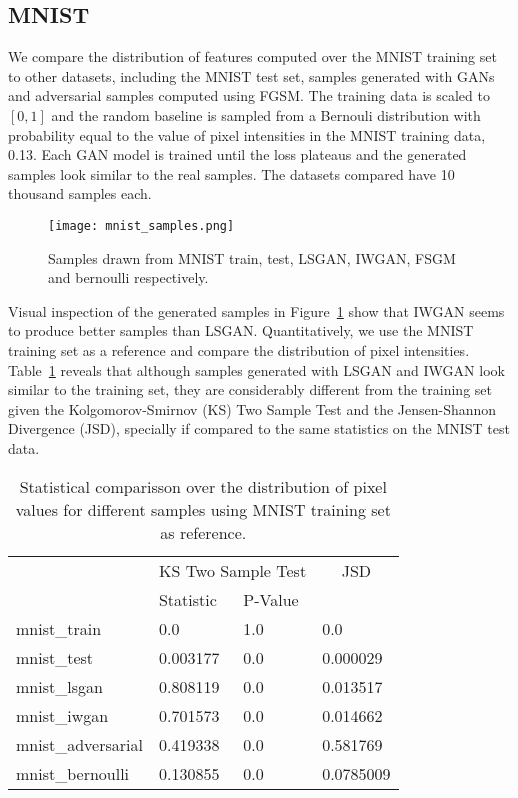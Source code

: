 \subsection{MNIST}
We compare the distribution of features computed over the MNIST training set 
to other datasets, including
the MNIST test set, samples generated with GANs and adversarial samples computed 
using FGSM. The training data is
scaled to $[0, 1]$ and the random baseline is sampled from a Bernouli distribution with 
probability equal to the value of pixel intensities in the
MNIST training data, 0.13. Each GAN model is trained until the loss plateaus 
and the generated samples look similar to the real samples. The datasets
compared have 10 thousand samples each.

\begin{figure}[!h]
  \begin{center}
  \texttt{[image: mnist\_samples.png]}
  \caption{Samples drawn from MNIST train, test,
LSGAN, IWGAN, FSGM and bernoulli respectively.}
  \label{fig:mnist_samples}
  \end{center}
\end{figure}

Visual inspection of the generated samples in
Figure~\ref{fig:mnist_samples} show that IWGAN seems to produce better samples
than LSGAN. Quantitatively, we use the MNIST training set as a reference and compare the
distribution of pixel intensities.  Table~\ref{tbl:mnist_pixel} reveals that
although samples generated with LSGAN and IWGAN look similar to the training
set, they are considerably different from the training set given the Kolgomorov-Smirnov (KS) Two
Sample Test and the Jensen-Shannon Divergence (JSD), specially if compared to
the same statistics on the MNIST test data. 

\begin{table}[!h]
\centering
\begin{tabular}{l|ll|l|}
                   & \multicolumn{2}{c|}{\cellcolor[HTML]{C0C0C0}KS Two Sample Test} & \multicolumn{1}{c|}{\cellcolor[HTML]{C0C0C0}JSD} \\
                   & Statistic   & P-Value   &                \\
mnist\_train       & 0.0         & 1.0       & 0.0            \\
mnist\_test        & 0.003177    & 0.0       & 0.000029       \\
mnist\_lsgan       & 0.808119    & 0.0       & 0.013517       \\
mnist\_iwgan       & 0.701573    & 0.0       & 0.014662       \\
mnist\_adversarial & 0.419338    & 0.0       & 0.581769       \\
mnist\_bernoulli   & 0.130855    & 0.0       & 0.0785009      
\end{tabular}
\caption{Statistical comparisson over the distribution of pixel values for
different samples using MNIST training set as reference.}
\label{tbl:mnist_pixel}
\end{table}

